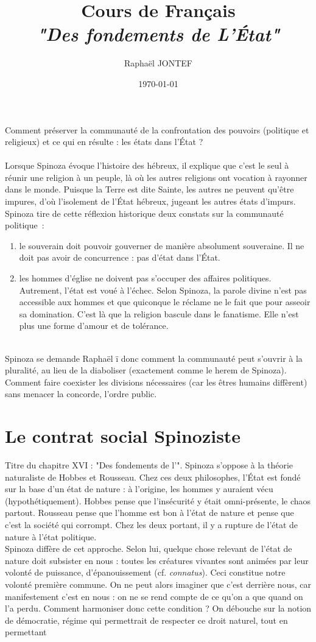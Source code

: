 \documentclass[a4paper,12pt]{article}
\title{Cours de Français\\ \Large \textit{"Des fondements de L'État"}}
\author{Raphaël JONTEF}
\date{\today}
\begin{document}
\maketitle
Comment préserver la communauté de la confrontation des pouvoirs (politique et religieux) et ce qui en résulte : les états dans l'État ?\\\\

Lorsque Spinoza évoque l'histoire des hébreux, il explique que c'est le seul à réunir une religion à un peuple, là où les autres religions ont vocation à rayonner dans le monde. Puisque la Terre est dite Sainte, les autres ne peuvent qu'être impures, d'où l'isolement de l'État hébreux, jugeant les autres états d'impurs. Spinoza tire de cette réflexion historique deux constats sur la communauté politique~:
\begin{enumerate}
    \item le souverain doit pouvoir gouverner de manière absolument souveraine. Il ne doit pas avoir de concurrence : pas d'état dans l'État.
    \item les hommes d'église ne doivent pas s'occuper des affaires politiques. Autrement, l'état est voué à l'échec. Selon Spinoza, la parole divine n'est pas accessible aux hommes et que quiconque le réclame ne le fait que pour asseoir sa domination. C'est là que la religion bascule dans le fanatisme. Elle n'est plus une forme d'amour et de tolérance.
\end{enumerate}
\\
Spinoza se demande Raphaël ï donc comment la communauté peut s'ouvrir à la pluralité, au lieu de la diaboliser (exactement comme le herem de Spinoza). Comment faire coexister les divisions nécessaires (car les êtres humains diffèrent) sans menacer la concorde, l'ordre public.

\section{Le contrat social Spinoziste}

Titre du chapitre XVI : "Des fondements de l'". Spinoza s'oppose à la théorie naturaliste de Hobbes et Rousseau. Chez ces deux philosophes, l'État est fondé sur la base d'un état de nature : à l'origine, les hommes y auraient vécu (hypothétiquement). Hobbes pense que l'insécurité y était omni-présente, le chaos partout. Rousseau pense que l'homme est bon à l'état de nature et pense que c'est la société qui corrompt. Chez les deux portant, il y a rupture de l'état de nature à l'état politique. \\
Spinoza diffère de cet approche. Selon lui, quelque chose relevant de l'état de nature doit subsister en nous : toutes les créatures vivantes sont animées par leur volonté de puissance, d'épanouissement (cf. \textit{connatus}). Ceci constitue notre volonté première commune. On ne peut alors imaginer que c'est derrière nous, car manifestement c'est en nous : on ne se rend compte de ce qu'on a que quand on l'a perdu. Comment harmoniser donc cette condition ? On débouche sur la notion de démocratie, régime qui permettrait de respecter ce droit naturel, tout en permettant 
\end{document}
